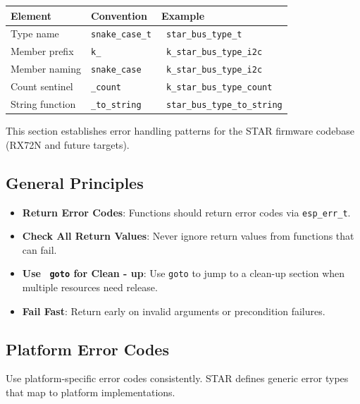 \begin{center}
\begin{tabular}{|l|l|l|}
\hline
\textbf{Element} & \textbf{Convention} & \textbf{Example} \\
\hline
Type name & \texttt{snake\_case\_t} & \texttt{
      star\_bus\_type\_t} \\
\hline
Member prefix & \texttt{k\_} & \texttt{
      k\_star\_bus\_type\_i2c} \\
\hline
Member naming & \texttt{snake\_case} & \texttt{
      k\_star\_bus\_type\_i2c} \\
\hline
Count sentinel & \texttt{\_count} & \texttt{
      k\_star\_bus\_type\_count} \\
\hline
String function & \texttt{\_to\_string} & \texttt{
      star\_bus\_type\_to\_string} \\
\hline
\end{tabular}
\end{center}



This section establishes error handling patterns for the STAR firmware codebase (RX72N and future targets).

\subsection{General Principles}

\begin{itemize}
    \item \textbf{Return Error Codes}: Functions should return error codes via \texttt{esp\_err\_t}.
    \item \textbf{Check All Return Values}: Never ignore return values from functions that can fail.
    \item \textbf{Use \texttt { goto} for
        Clean - up}: Use \texttt{goto} to jump to a clean-up section when multiple resources need release.
    \item \textbf{Fail Fast}: Return early on invalid arguments or precondition failures.
\end{itemize}

\subsection{Platform Error Codes}

Use platform-specific error codes consistently. STAR defines generic error types that map to platform implementations.

